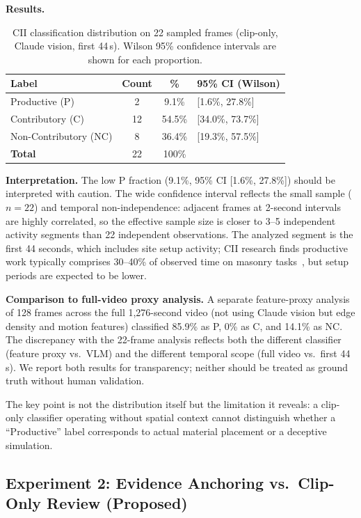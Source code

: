 \documentclass[sigconf,nonacm]{acmart}
\begin{document}
\textbf{Results.}

\begin{table}[h]
\centering
\caption{CII classification distribution on 22 sampled frames (clip-only, Claude vision, first 44\,s).
Wilson 95\% confidence intervals are shown for each proportion.}
\begin{tabular}{lccl}
\toprule
Label & Count & \% & 95\% CI (Wilson) \\
\midrule
Productive (P) & 2 & 9.1\% & [1.6\%, 27.8\%] \\
Contributory (C) & 12 & 54.5\% & [34.0\%, 73.7\%] \\
Non-Contributory (NC) & 8 & 36.4\% & [19.3\%, 57.5\%] \\
\midrule
\textbf{Total} & 22 & 100\% & \\
\bottomrule
\end{tabular}
\label{tab:cii}
\end{table}

\textbf{Interpretation.}
The low P fraction (9.1\%, 95\% CI [1.6\%, 27.8\%]) should be interpreted with caution.
The wide confidence interval reflects the small sample ($n = 22$) and temporal non-independence: adjacent frames at 2-second intervals are highly correlated, so the effective sample size is closer to 3--5 independent activity segments than 22 independent observations.
The analyzed segment is the first 44 seconds, which includes site setup activity; CII research finds productive work typically comprises 30--40\% of observed time on masonry tasks~\cite{cii252}, but setup periods are expected to be lower.

\textbf{Comparison to full-video proxy analysis.}
A separate feature-proxy analysis of 128 frames across the full 1,276-second video (not using Claude vision but edge density and motion features) classified 85.9\% as P, 0\% as C, and 14.1\% as NC.
The discrepancy with the 22-frame analysis reflects both the different classifier (feature proxy vs.\ VLM) and the different temporal scope (full video vs.\ first 44\,s).
We report both results for transparency; neither should be treated as ground truth without human validation.

The key point is not the distribution itself but the limitation it reveals: a clip-only classifier operating without spatial context cannot distinguish whether a ``Productive'' label corresponds to actual material placement or a deceptive simulation.

\subsection{Experiment 2: Evidence Anchoring vs.\ Clip-Only Review (Proposed)}
\label{sec:exp2}
\end{document}

